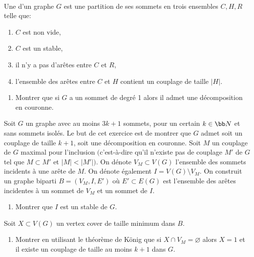 \begin{td-exo}\,\\
    Une  d'un graphe \(G\) est une partition de ses sommets en trois ensembles \(C, H, R\) telle que:
    \begin{enumerate}[label=(\roman*)]
        \item \(C\) est non vide,
        \item \(C\) est un stable,
        \item il n'y a pas d'arêtes entre \(C\) et \(R\),
        \item l'ensemble des arêtes entre \(C\) et \(H\) contient un couplage de taille \(\left| H \right|\).
    \end{enumerate}

    \begin{enumerate}
        \item Montrer que si \(G\) a un sommet de degré 1 alors il admet une décomposition en couronne.
    \end{enumerate}
    Soit \(G\) un graphe avec au moins \(3k + 1\) sommets, pour un certain \(k \in \bb N\) et sans sommets isolés.
    Le but de cet exercice est de montrer que \(G\) admet soit un couplage de taille \(k+1\), soit une décomposition en couronne.
    Soit \(M\) un couplage de \(G\) maximal pour l'inclusion \(\big(\)c'est-à-dire qu'il n'existe pas de couplage \(M'\) de \(G\) tel que \(M \subset M'\) et \(\left| M \right| < \left| M' \right|\big)\).
    On dénote \(V_M \subset V(G)\) l'ensemble des sommets incidents à une arête de \(M\).
    On dénote également \(I = V(G) \setminus V_M\).
    On construit un graphe biparti \(B = (V_M, I, E')\) où \(E' \subset E(G)\) est l'ensemble des arêtes incidentes à un sommet de \(V_M\) et un sommet de \(I\).

    \begin{enumerate}[start=2]
        \item Montrer que \(I\) est un stable de \(G\).
    \end{enumerate}

    Soit \(X \subset V(G)\) un vertex cover de taille minimum dans \(B\).

    \begin{enumerate}[start=3]
        \item Montrer en utilisant le théorème de König que si \(X \cap V_M = \varnothing\) alors \(X = 1\) et il existe un couplage de taille au moins \(k + 1\) dans \(G\).


\end{enumerate}
\end{td-exo}
